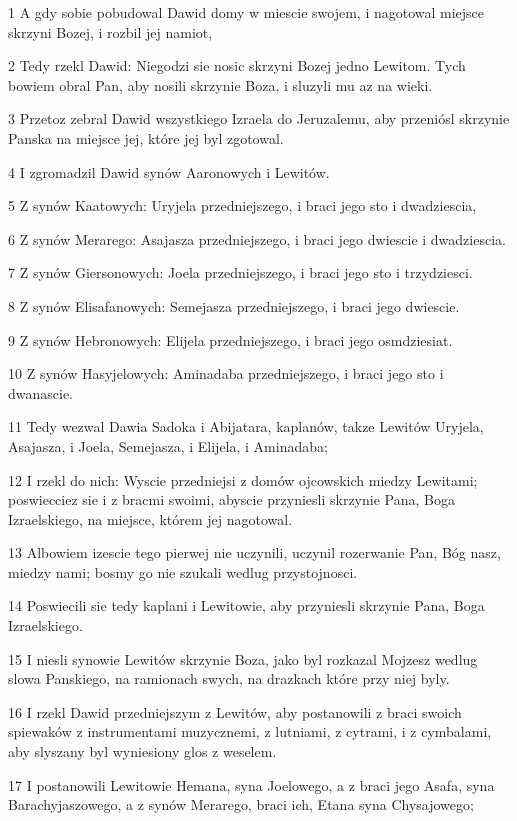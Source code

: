 \par 1 A gdy sobie pobudowal Dawid domy w miescie swojem, i nagotowal miejsce skrzyni Bozej, i rozbil jej namiot,
\par 2 Tedy rzekl Dawid: Niegodzi sie nosic skrzyni Bozej jedno Lewitom. Tych bowiem obral Pan, aby nosili skrzynie Boza, i sluzyli mu az na wieki.
\par 3 Przetoz zebral Dawid wszystkiego Izraela do Jeruzalemu, aby przeniósl skrzynie Panska na miejsce jej, które jej byl zgotowal.
\par 4 I zgromadzil Dawid synów Aaronowych i Lewitów.
\par 5 Z synów Kaatowych: Uryjela przedniejszego, i braci jego sto i dwadziescia,
\par 6 Z synów Merarego: Asajasza przedniejszego, i braci jego dwiescie i dwadziescia.
\par 7 Z synów Giersonowych: Joela przedniejszego, i braci jego sto i trzydziesci.
\par 8 Z synów Elisafanowych: Semejasza przedniejszego, i braci jego dwiescie.
\par 9 Z synów Hebronowych: Elijela przedniejszego, i braci jego osmdziesiat.
\par 10 Z synów Hasyjelowych: Aminadaba przedniejszego, i braci jego sto i dwanascie.
\par 11 Tedy wezwal Dawia Sadoka i Abijatara, kaplanów, takze Lewitów Uryjela, Asajasza, i Joela, Semejasza, i Elijela, i Aminadaba;
\par 12 I rzekl do nich: Wyscie przedniejsi z domów ojcowskich miedzy Lewitami; poswiecciez sie i z bracmi swoimi, abyscie przyniesli skrzynie Pana, Boga Izraelskiego, na miejsce, którem jej nagotowal.
\par 13 Albowiem izescie tego pierwej nie uczynili, uczynil rozerwanie Pan, Bóg nasz, miedzy nami; bosmy go nie szukali wedlug przystojnosci.
\par 14 Poswiecili sie tedy kaplani i Lewitowie, aby przyniesli skrzynie Pana, Boga Izraelskiego.
\par 15 I niesli synowie Lewitów skrzynie Boza, jako byl rozkazal Mojzesz wedlug slowa Panskiego, na ramionach swych, na drazkach które przy niej byly.
\par 16 I rzekl Dawid przedniejszym z Lewitów, aby postanowili z braci swoich spiewaków z instrumentami muzycznemi, z lutniami, z cytrami, i z cymbalami, aby slyszany byl wyniesiony glos z weselem.
\par 17 I postanowili Lewitowie Hemana, syna Joelowego, a z braci jego Asafa, syna Barachyjaszowego, a z synów Merarego, braci ich, Etana syna Chysajowego;
